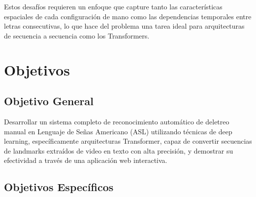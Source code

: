 \documentclass[12pt,a4paper]{article}
\begin{document}
Estos desafíos requieren un enfoque que capture tanto las características espaciales de cada configuración de mano como las dependencias temporales entre letras consecutivas, lo que hace del problema una tarea ideal para arquitecturas de secuencia a secuencia como los Transformers.

\section{Objetivos}

\subsection{Objetivo General}

Desarrollar un sistema completo de reconocimiento automático de deletreo manual en Lenguaje de Señas Americano (ASL) utilizando técnicas de deep learning, específicamente arquitecturas Transformer, capaz de convertir secuencias de landmarks extraídos de video en texto con alta precisión, y demostrar su efectividad a través de una aplicación web interactiva.

\subsection{Objetivos Específicos}
\end{document}
